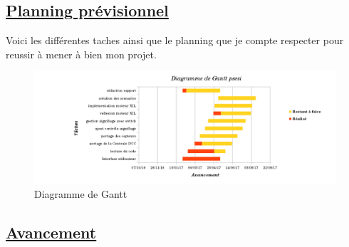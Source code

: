\subsection{\underline{ Planning pr\'evisionnel}}
\label{sec:planning}

  Voici les différentes taches ainsi que le planning que je compte
respecter pour reussir à mener à bien mon projet.


\begin{figure}[ht]
\centering
\includegraphics[scale=0.5]{gantt.png}
\caption{Diagramme de Gantt}
\label{fig2}
\end{figure}


\subsection{\underline{ Avancement}}
\label{sec:avanc}


\newpage




